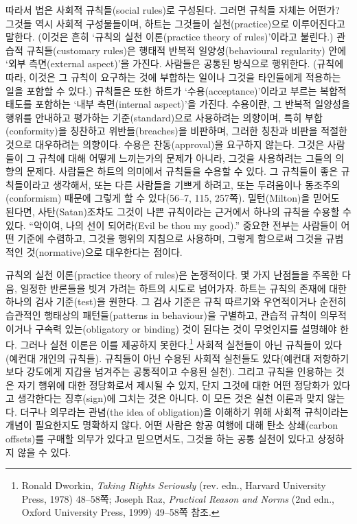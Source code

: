 따라서 법은 사회적 규칙들(social rules)로 구성된다. 그러면 규칙들 자체는
어떤가? 그것들 역시 사회적 구성물들이며, 하트는 그것들이
실천(practice)으로 이루어진다고 말한다. (이것은 흔히 ‘규칙의 실천
이론(practice theory of rules)’이라고 불린다.) 관습적 규칙들(customary
rules)은 행태적 반복적 일양성(behavioural regularity) 안에 ‘외부
측면(external aspect)’을 가진다. 사람들은 공통된 방식으로 행위한다.
(규칙에 따라, 이것은 그 규칙이 요구하는 것에 부합하는 일이나 그것을
타인들에게 적용하는 일을 포함할 수 있다.) 규칙들은 또한 하트가
‘수용(acceptance)’이라고 부르는 복합적 태도를 포함하는 ‘내부
측면(internal aspect)’을 가진다. 수용이란, 그 반복적 일양성을 행위를
안내하고 평가하는 기준(standard)으로 사용하려는 의향이며, 특히
부합(conformity)을 칭찬하고 위반들(breaches)을 비판하며, 그러한 칭찬과
비판을 적절한 것으로 대우하려는 의향이다. 수용은 찬동(approval)을
요구하지 않는다. 그것은 사람들이 그 규칙에 대해 어떻게 느끼는가의 문제가
아니라, 그것을 사용하려는 그들의 의향의 문제다. 사람들은 하트의 의미에서
규칙들을 수용할 수 있다. 그 규칙들이 좋은 규칙들이라고 생각해서, 또는
다른 사람들을 기쁘게 하려고, 또는 두려움이나 동조주의(conformism) 때문에
그렇게 할 수 있다(56--7, 115, 257쪽). 밀턴(Milton)을 믿어도 된다면,
사탄(Satan)조차도 그것이 나쁜 규칙이라는 근거에서 하나의 규칙을 수용할
수 있다. “악이여, 나의 선이 되어라(Evil be thou my good).” 중요한
전부는 사람들이 어떤 기준에 수렴하고, 그것을 행위의 지침으로 사용하며,
그렇게 함으로써 그것을 규범적인 것(normative)으로 대우한다는 점이다.

규칙의 실천 이론(practice theory of rules)은 논쟁적이다. 몇 가지
난점들을 주목한 다음, 일정한 반론들을 빗겨 가려는 하트의 시도로
넘어가자. 하트는 규칙의 존재에 대한 하나의 검사 기준(test)을 원한다. 그
검사 기준은 규칙 따르기와 우연적이거나 순전히 습관적인 행태상의
패턴들(patterns in behaviour)을 구별하고, 관습적 규칙이 의무적이거나
구속력 있는(obligatory or binding) 것이 된다는 것이 무엇인지를 설명해야
한다. 그러나 실천 이론은 이를 제공하지 못한다.\footnote{Ronald Dworkin,
  \emph{Taking Rights Seriously} (rev. edn., Harvard University Press,
  1978) 48--58쪽; Joseph Raz, \emph{Practical Reason and Norms} (2nd
  edn., Oxford University Press, 1999) 49--58쪽 참조.} 사회적 실천들이
아닌 규칙들이 있다(예컨대 개인의 규칙들). 규칙들이 아닌 수용된 사회적
실천들도 있다(예컨대 저항하기보다 강도에게 지갑을 넘겨주는 공통적이고
수용된 실천). 그리고 규칙을 인용하는 것은 자기 행위에 대한 정당화로서
제시될 수 있지, 단지 그것에 대한 어떤 정당화가 있다고 생각한다는
징후(sign)에 그치는 것은 아니다. 이 모든 것은 실천 이론과 맞지 않는다.
더구나 의무라는 관념(the idea of obligation)을 이해하기 위해 사회적
규칙이라는 개념이 필요한지도 명확하지 않다. 어떤 사람은 항공 여행에 대해
탄소 상쇄(carbon offsets)를 구매할 의무가 있다고 믿으면서도, 그것을 하는
공통 실천이 있다고 상정하지 않을 수 있다.

